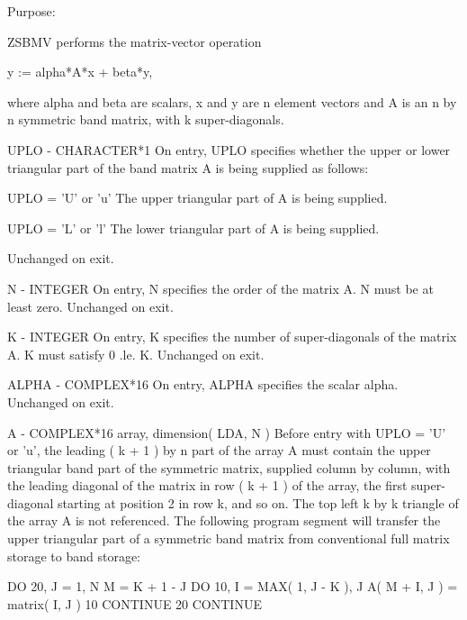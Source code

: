 \begin{DoxyParagraph}{Purpose\+: }
\begin{DoxyVerb} ZSBMV  performs the matrix-vector  operation

    y := alpha*A*x + beta*y,

 where alpha and beta are scalars, x and y are n element vectors and
 A is an n by n symmetric band matrix, with k super-diagonals.\end{DoxyVerb}
 \begin{DoxyVerb}  UPLO   - CHARACTER*1
           On entry, UPLO specifies whether the upper or lower
           triangular part of the band matrix A is being supplied as
           follows:

              UPLO = 'U' or 'u'   The upper triangular part of A is
                                  being supplied.

              UPLO = 'L' or 'l'   The lower triangular part of A is
                                  being supplied.

           Unchanged on exit.

  N      - INTEGER
           On entry, N specifies the order of the matrix A.
           N must be at least zero.
           Unchanged on exit.

  K      - INTEGER
           On entry, K specifies the number of super-diagonals of the
           matrix A. K must satisfy  0 .le. K.
           Unchanged on exit.

  ALPHA  - COMPLEX*16
           On entry, ALPHA specifies the scalar alpha.
           Unchanged on exit.

  A      - COMPLEX*16 array, dimension( LDA, N )
           Before entry with UPLO = 'U' or 'u', the leading ( k + 1 )
           by n part of the array A must contain the upper triangular
           band part of the symmetric matrix, supplied column by
           column, with the leading diagonal of the matrix in row
           ( k + 1 ) of the array, the first super-diagonal starting at
           position 2 in row k, and so on. The top left k by k triangle
           of the array A is not referenced.
           The following program segment will transfer the upper
           triangular part of a symmetric band matrix from conventional
           full matrix storage to band storage:

                 DO 20, J = 1, N
                    M = K + 1 - J
                    DO 10, I = MAX( 1, J - K ), J
                       A( M + I, J ) = matrix( I, J )
              10    CONTINUE
              20 CONTINUE


\end{DoxyVerb}
\end{DoxyParagraph}
